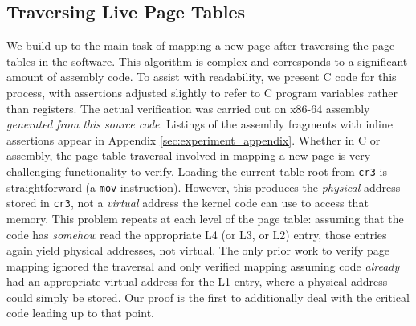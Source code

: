 \subsection{Traversing Live Page Tables}
\label{sec:traversingC}
We build up to the main task of mapping a new page after traversing the page tables in the software.
This algorithm is complex and corresponds to a significant amount of assembly code.
To assist with readability, we present C code for this process, with assertions adjusted slightly to refer to
C program variables rather than registers. The actual verification was carried out on x86-64 assembly
\emph{generated from this source code}.
Listings of the assembly fragments with inline assertions appear in Appendix \ref{sec:experiment_appendix}. %
Whether in C or assembly,
the page table traversal involved in mapping a new page is very challenging functionality to verify.
Loading the current table root from \lstinline|cr3| is straightforward (a \lstinline|mov| instruction).
However, this produces the \emph{physical} address stored in \lstinline|cr3|, not a \emph{virtual} address the kernel code can use to access that memory.
This problem repeats at each level of the page table: assuming that the code has \emph{somehow} read the appropriate L4 (or L3, or L2) entry, those entries again
yield physical addresses, not virtual.
The only prior work to verify page mapping ignored the traversal and only verified mapping
assuming code \emph{already} had an appropriate virtual address for the L1 entry, where a physical
address could simply be stored. Our proof is the first to additionally deal with the critical code
leading up to that point.

